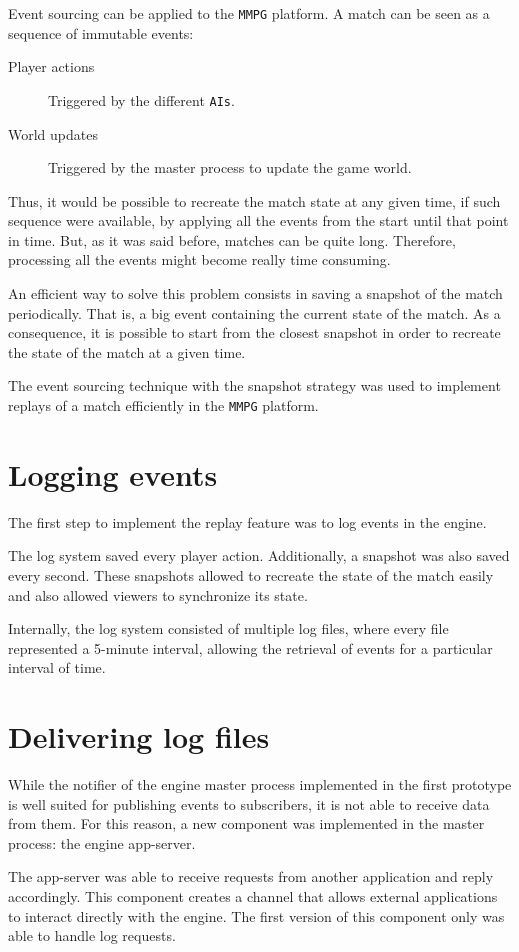 \documentclass[a4paper,11pt,titlepage,abstract,numbers=noenddot,automark,mnsy,intlimits,rgb,dvipsnames]{report}
\begin{document}
Event sourcing can be applied to the \texttt{MMPG} platform. A match can be seen as a sequence of immutable events:
\begin{description}
\item[Player actions]
Triggered by the different \texttt{AIs}.
\item[World updates]
Triggered by the master process to update the game world.
\end{description}
Thus, it would be possible to recreate the match state at any given time, if such sequence were available, by applying
all the events from the start until that point in time. But, as it was said before, matches can be quite long. Therefore,
processing all the events might become really time consuming.

An efficient way to solve this problem consists in saving a snapshot of the match periodically. That is, a big event
containing the current state of the match. As a consequence, it is possible to start from the closest snapshot in order
to recreate the state of the match at a given time.

The event sourcing technique with the snapshot strategy was used to implement replays of a match efficiently in
the \texttt{MMPG} platform.
\section{Logging events}
The first step to implement the replay feature was to log events in the engine.

The log system saved every player action. Additionally, a snapshot was also saved every second.
These snapshots allowed to recreate the state of the match easily and also allowed viewers to synchronize its state.

Internally, the log system consisted of multiple log files, where every file represented a 5-minute interval, allowing the
retrieval of events for a particular interval of time.
\section{Delivering log files}
While the notifier of the engine master process implemented in the first prototype is well suited for publishing
events to subscribers, it is not able to receive data from them. For this reason, a new component was implemented in the
master process: the engine app-server.

The app-server was able to receive requests from another application and reply accordingly. This component creates a channel that
allows external applications to interact directly with the engine. The first version of this component only was able to handle
log requests.
\end{document}
